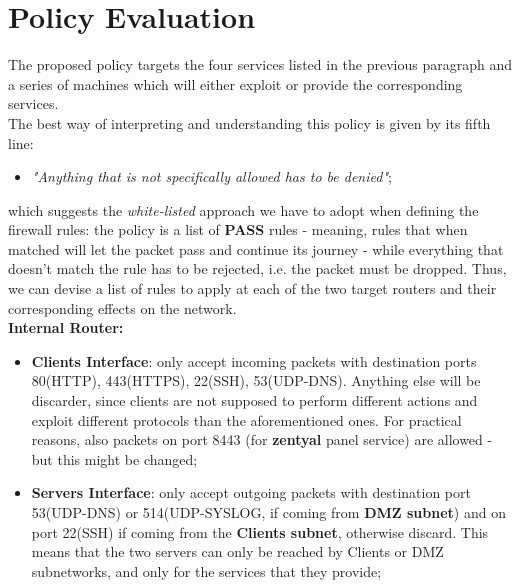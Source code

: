 \section{Policy Evaluation}
The proposed policy targets the four services listed in the previous paragraph and a series of machines which will either exploit or provide the corresponding services.\\
The best way of interpreting and understanding this policy is given by its fifth line:\\
\begin{itemize}
\item \textit{"Anything that is not specifically allowed has to be denied"};
\end{itemize}

which suggests the \textit{white-listed} approach we have to adopt when defining the firewall rules: the policy is a list of \textbf{PASS} rules - meaning, rules that when matched will let the packet pass and continue its journey - while everything that doesn't match the rule has to be rejected, i.e. the packet must be dropped. Thus, we can devise a list of rules to apply at each of the two target routers and their corresponding effects on the network.\\

\textbf{Internal Router:}
\begin{itemize}
\item \textbf{Clients Interface}: only accept incoming packets with destination ports 80(HTTP), 443(HTTPS), 22(SSH), 53(UDP-DNS). Anything else will be discarder, since clients are not supposed to perform different actions and exploit different protocols than the aforementioned ones. For practical reasons, also packets on port 8443 (for \textbf{zentyal} panel service) are allowed - but this might be changed;
\item \textbf{Servers Interface}: only accept outgoing packets with destination port 53(UDP-DNS) or 514(UDP-SYSLOG, if coming from \textbf{DMZ subnet}) and on port 22(SSH) if coming from the \textbf{Clients subnet}, otherwise discard. This means that the two servers can only be reached by Clients or DMZ subnetworks, and only for the services that they provide;
\end{itemize}


